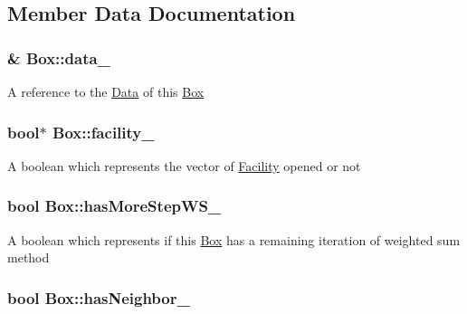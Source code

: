 \subsection{\-Member \-Data \-Documentation}
\hypertarget{classBox_add736972063b9a9c0239194eaf31efae}{
\subsubsection[{data\-\_\-}]{\& {\bf \-Box\-::data\-\_\-}}}\label{classBox_add736972063b9a9c0239194eaf31efae}
\-A reference to the {\ttfamily \hyperlink{classData}{\-Data}} of this {\ttfamily \hyperlink{classBox}{\-Box}} \hypertarget{classBox_a2193b73a3e12612041dedf93ec410f59}{
\subsubsection[{facility\-\_\-}]{\setlength{\rightskip}{0pt plus 5cm}bool$\ast$ {\bf \-Box\-::facility\-\_\-}}}\label{classBox_a2193b73a3e12612041dedf93ec410f59}
\-A boolean which represents the vector of {\ttfamily \hyperlink{classFacility}{\-Facility}} opened or not \hypertarget{classBox_a177908b9eaab60f32c86800a2f725ecd}{
\subsubsection[{has\-More\-Step\-W\-S\-\_\-}]{\setlength{\rightskip}{0pt plus 5cm}bool {\bf \-Box\-::has\-More\-Step\-W\-S\-\_\-}}}\label{classBox_a177908b9eaab60f32c86800a2f725ecd}
\-A boolean which represents if this {\ttfamily \hyperlink{classBox}{\-Box}} has a remaining iteration of weighted sum method \hypertarget{classBox_a6018908ca53a87f0265fbeefd8884a4b}{
\subsubsection[{has\-Neighbor\-\_\-}]{\setlength{\rightskip}{0pt plus 5cm}bool {\bf \-Box\-::has\-Neighbor\-\_\-}}}\label{classBox_a6018908ca53a87f0265fbeefd8884a4b}
